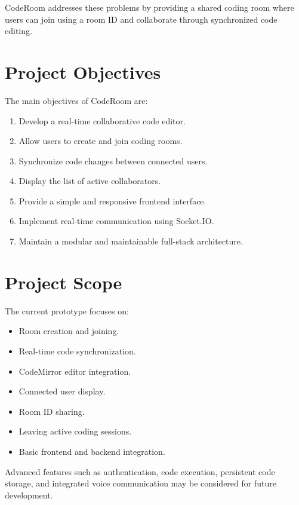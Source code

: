 \documentclass[12pt,a4paper,oneside]{report}
\begin{document}
CodeRoom addresses these problems by providing a shared coding room where users can join using a room ID and collaborate through synchronized code editing.

\section{Project Objectives}

The main objectives of CodeRoom are:

\begin{enumerate}
    \item Develop a real-time collaborative code editor.
    \item Allow users to create and join coding rooms.
    \item Synchronize code changes between connected users.
    \item Display the list of active collaborators.
    \item Provide a simple and responsive frontend interface.
    \item Implement real-time communication using Socket.IO.
    \item Maintain a modular and maintainable full-stack architecture.
\end{enumerate}

\section{Project Scope}

The current prototype focuses on:

\begin{itemize}
    \item Room creation and joining.
    \item Real-time code synchronization.
    \item CodeMirror editor integration.
    \item Connected user display.
    \item Room ID sharing.
    \item Leaving active coding sessions.
    \item Basic frontend and backend integration.
\end{itemize}

Advanced features such as authentication, code execution, persistent code storage, and integrated voice communication may be considered for future development.

\end{document}
